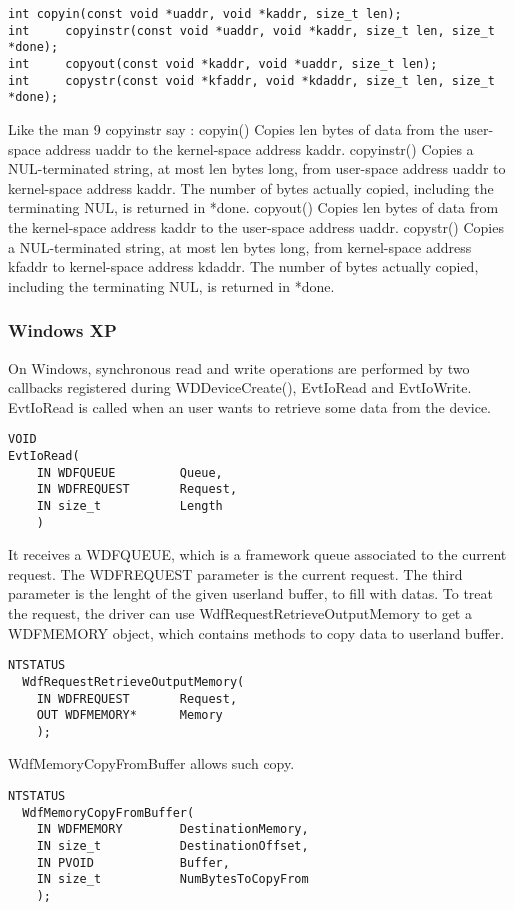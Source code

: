 \documentclass[11pt]{report}
\begin{document}
\begin{lstlisting}
int	copyin(const void *uaddr, void *kaddr, size_t len);
int     copyinstr(const void *uaddr, void *kaddr, size_t len, size_t *done);
int     copyout(const void *kaddr, void *uaddr, size_t len);
int     copystr(const void *kfaddr, void *kdaddr, size_t len, size_t *done);
\end{lstlisting}
Like the man 9 copyinstr say :
copyin()      Copies len bytes of data from the user-space address uaddr to the kernel-space address kaddr.
copyinstr()   Copies a NUL-terminated string, at most len bytes long, from user-space address uaddr to kernel-space address kaddr.  The number of bytes
              actually copied, including the terminating NUL, is returned in *done.
copyout()     Copies len bytes of data from the kernel-space address kaddr to the user-space address uaddr.
copystr()     Copies a NUL-terminated string, at most len bytes long, from kernel-space address kfaddr to kernel-space address kdaddr.  The number of bytes
              actually copied, including the terminating NUL, is returned in *done.

\subsubsection{Windows XP}
On Windows, synchronous read and write operations are performed by
two callbacks registered during WDDeviceCreate(), EvtIoRead and EvtIoWrite.
EvtIoRead is called when an user wants to retrieve some data from
the device.

\begin{lstlisting}
VOID
EvtIoRead(
    IN WDFQUEUE         Queue,
    IN WDFREQUEST       Request,
    IN size_t           Length
    )
\end{lstlisting}

It receives a WDFQUEUE, which is a framework queue associated to the current request.
The WDFREQUEST parameter is the current request. The third parameter is the lenght
of the given userland buffer, to fill with datas.
To treat the request, the driver can use WdfRequestRetrieveOutputMemory
to get a WDFMEMORY object, which contains methods to copy data to userland buffer.
\begin{lstlisting}
NTSTATUS
  WdfRequestRetrieveOutputMemory(
    IN WDFREQUEST       Request,
    OUT WDFMEMORY*      Memory
    );
\end{lstlisting}

WdfMemoryCopyFromBuffer allows such copy.
\begin{lstlisting}
NTSTATUS
  WdfMemoryCopyFromBuffer(
    IN WDFMEMORY        DestinationMemory,
    IN size_t           DestinationOffset,
    IN PVOID            Buffer,
    IN size_t           NumBytesToCopyFrom
    );
\end{lstlisting}
\end{document}
